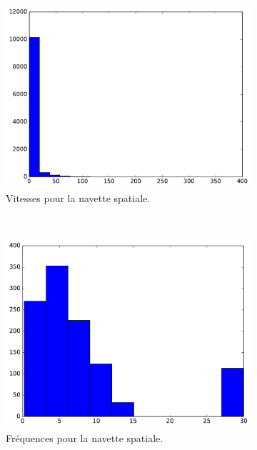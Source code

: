 	\begin{figure}
		\begin{subfigure}[t]{\subImgWclicks}
			\centering
			\includegraphics[width=\textwidth]{figures/ch3/spaceA_speed}
			\caption{Vitesses pour la navette spatiale.}
			\label{fig:spaceA_speed}
		\end{subfigure}
		~
		\begin{subfigure}[t]{\subImgWclicks}
			\centering
			\includegraphics[width=\textwidth]{figures/ch3/spaceA_frequency}
			\caption{Fréquences pour la navette spatiale.}
			\label{fig:spaceA_frequency}
		\end{subfigure}
		~
		\begin{subfigure}[t]{\subImgWclicks}

\end{subfigure}
\end{figure}
